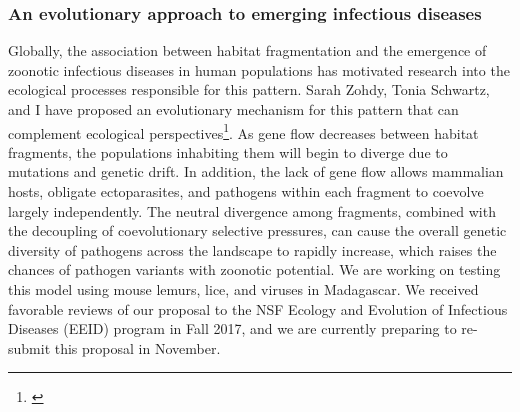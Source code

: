 \subsubsection*{An evolutionary approach to emerging infectious diseases}
Globally, the association between habitat fragmentation and the emergence of
zoonotic infectious diseases in human populations has motivated research into
the ecological processes responsible for this pattern.
Sarah Zohdy, Tonia Schwartz, and I have proposed an evolutionary mechanism for
this pattern that can complement ecological
perspectives\footnote{\label{Zohdy19}}.
As gene flow decreases between habitat fragments, the populations inhabiting
them will begin to diverge due to mutations and genetic drift.
In addition, the lack of gene flow allows mammalian hosts, obligate
ectoparasites, and pathogens within each fragment to coevolve largely
independently.
The neutral divergence among fragments, combined with the decoupling of
coevolutionary selective pressures, can cause the overall genetic
diversity of pathogens across the landscape to rapidly increase,
which raises the chances of pathogen variants with zoonotic potential.
We are working on testing this model using mouse lemurs, lice, and viruses in
Madagascar.
We received favorable reviews of our proposal to the NSF Ecology and Evolution
of Infectious Diseases (EEID) program in Fall 2017, and we are currently
preparing to re-submit this proposal in November.




